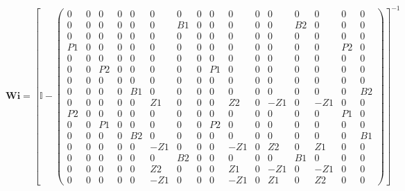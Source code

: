 \[ \mathbf{Wi} =  \left[ \mathbb{I}  -
\left(\begin{array}{cccccccccccccccc} 0 & 0 & 0 & 0 & 0 & 0 & 0 & 0 &
0 & 0 & 0 & 0 & 0 & 0 & 0 & 0 \\ 0 & 0 & 0 & 0 & 0 & 0 & B1 & 0 & 0 &
0 & 0 & 0 & B2 & 0 & 0 & 0 \\ 0 & 0 & 0 & 0 & 0 & 0 & 0 & 0 & 0 & 0 &
0 & 0 & 0 & 0 & 0 & 0 \\ P1 & 0 & 0 & 0 & 0 & 0 & 0 & 0 & 0 & 0 & 0 &
0 & 0 & 0 & P2 & 0 \\ 0 & 0 & 0 & 0 & 0 & 0 & 0 & 0 & 0 & 0 & 0 & 0 &
0 & 0 & 0 & 0 \\ 0 & 0 & P2 & 0 & 0 & 0 & 0 & 0 & P1 & 0 & 0 & 0 & 0 &
0 & 0 & 0 \\ 0 & 0 & 0 & 0 & 0 & 0 & 0 & 0 & 0 & 0 & 0 & 0 & 0 & 0 & 0
& 0 \\ 0 & 0 & 0 & 0 & B1 & 0 & 0 & 0 & 0 & 0 & 0 & 0 & 0 & 0 & 0 & B2
\\ 0 & 0 & 0 & 0 & 0 & Z1 & 0 & 0 & 0 & Z2 & 0 & -Z1 & 0 & -Z1 & 0 & 0
\\ P2 & 0 & 0 & 0 & 0 & 0 & 0 & 0 & 0 & 0 & 0 & 0 & 0 & 0 & P1 & 0 \\
0 & 0 & P1 & 0 & 0 & 0 & 0 & 0 & P2 & 0 & 0 & 0 & 0 & 0 & 0 & 0 \\ 0 &
0 & 0 & 0 & B2 & 0 & 0 & 0 & 0 & 0 & 0 & 0 & 0 & 0 & 0 & B1 \\ 0 & 0 &
0 & 0 & 0 & -Z1 & 0 & 0 & 0 & -Z1 & 0 & Z2 & 0 & Z1 & 0 & 0 \\ 0 & 0 &
0 & 0 & 0 & 0 & B2 & 0 & 0 & 0 & 0 & 0 & B1 & 0 & 0 & 0 \\ 0 & 0 & 0 &
0 & 0 & Z2 & 0 & 0 & 0 & Z1 & 0 & -Z1 & 0 & -Z1 & 0 & 0 \\ 0 & 0 & 0 &
0 & 0 & -Z1 & 0 & 0 & 0 & -Z1 & 0 & Z1 & 0 & Z2 & 0 & 0
\end{array}\right) \right]^{-1}  \]
